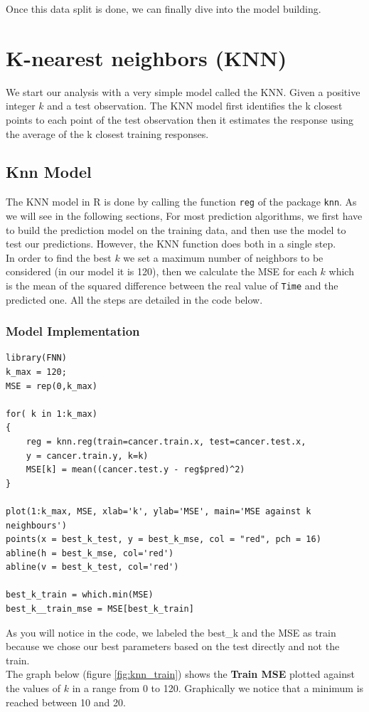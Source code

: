 \documentclass[]{report}
\begin{document}
Once this data split is done, we can finally dive into the model building.

\section{K-nearest neighbors (KNN)}
We start our analysis with a very simple model called the KNN.
Given a positive integer $k$ and a test observation. The KNN model first identifies the k closest points to each point of the test observation then it estimates the response using the average of the k closest training responses.\\ 

\subsection{Knn Model}
The KNN model in R is done by calling the function \texttt{reg} of the package \texttt{knn}. As we will see in the following sections, For most prediction algorithms, we first have to build the prediction model on the training data, and then use the model to test our predictions. However, the KNN function does both in a single step.\\ 
In order to find the best $k$ we set a maximum number of neighbors to be considered (in our model it is 120), then we calculate the MSE for each $k$ which is the mean of the squared difference between the real value of \texttt{Time} and the predicted one. All the steps are detailed in the code below.

\subsubsection{Model Implementation}
\begin{lstlisting}
library(FNN)
k_max = 120;
MSE = rep(0,k_max)

for( k in 1:k_max)
{
	reg = knn.reg(train=cancer.train.x, test=cancer.test.x, 
	y = cancer.train.y, k=k)
	MSE[k] = mean((cancer.test.y - reg$pred)^2)
}

plot(1:k_max, MSE, xlab='k', ylab='MSE', main='MSE against k neighbours')
points(x = best_k_test, y = best_k_mse, col = "red", pch = 16)
abline(h = best_k_mse, col='red')
abline(v = best_k_test, col='red')

best_k_train = which.min(MSE)
best_k__train_mse = MSE[best_k_train]
\end{lstlisting}

As you will notice in the code, we labeled the best\_k and the MSE as train because we chose our best parameters based on the test directly and not the train.\\
The graph below (figure \ref{fig:knn_train}) shows the \textbf{Train MSE} plotted against the values of $k$ in a range from 0 to 120. Graphically we notice that a minimum is reached between 10 and 20.
\end{document}
